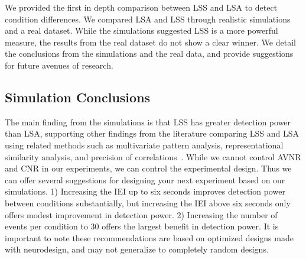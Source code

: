 \documentclass[10pt,letterpaper]{article}
\begin{document}
We provided the first in depth comparison between LSS and LSA to detect condition differences.
We compared LSA and LSS through realistic simulations and a real dataset.
While the simulations suggested LSS is a more powerful measure,
the results from the real dataset do not show a clear winner.
We detail the conclusions from the simulations and the real data, and provide
suggestions for future avenues of research.

\subsection*{Simulation Conclusions}
\label{discussion:simulation-conclusions}

The main finding from the simulations is that LSS has greater detection power than LSA,
supporting other findings from the literature comparing LSS and LSA using related methods such as
multivariate pattern analysis, representational similarity analysis, and precision of correlations~\cite{Mumford2012,Mumford2014a,Abdulrahman2016,Turner2012a}.
While we cannot control AVNR and CNR in our experiments, we can control the experimental design.
Thus we can offer several suggestions for designing your next experiment based on our simulations.
1) Increasing the IEI up to six seconds improves detection power between conditions substantially,
but increasing the IEI above six seconds only offers modest improvement in detection power.
2) Increasing the number of events per condition to 30 offers the largest benefit in detection power.
It is important to note these recommendations are based on optimized designs made with neurodesign,
and may not generalize to completely random designs.
\end{document}
